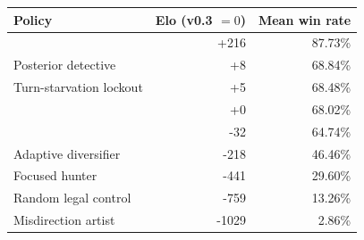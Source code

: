 \begin{tabular}{lrr}
\toprule
Policy & Elo (v0.3 $=0$) & Mean win rate \\
\midrule
\vfast{} & +216 & 87.73\% \\
Posterior detective & +8 & 68.84\% \\
Turn-starvation lockout & +5 & 68.48\% \\
\vthree{} & +0 & 68.02\% \\
\vtwo{} & -32 & 64.74\% \\
Adaptive diversifier & -218 & 46.46\% \\
Focused hunter & -441 & 29.60\% \\
Random legal control & -759 & 13.26\% \\
Misdirection artist & -1029 & 2.86\% \\
\bottomrule
\end{tabular}